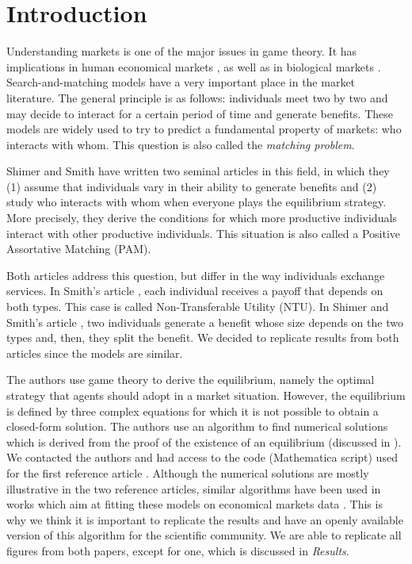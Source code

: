 \section*{Introduction}

Understanding markets is one of the major issues in game theory. It has implications in human economical markets \citep{osborne_bargaining_1990,chade_sorting_2017}, as well as in biological markets \citep{noe_biological_1995,hammerstein_biological_2016,fruteau_supply_2009,baumard_mutualistic_2013}. Search-and-matching models have a very important place in the market literature. The general principle is as follows: individuals meet two by two and may decide to interact for a certain period of time and generate benefits. These models are widely used to try to predict a fundamental property of markets: who interacts with whom. This question is also called the \textit{matching problem}.

Shimer and Smith have written two seminal articles \citep{shimer_assortative_2000,smith_marriage_2006} in this field, in which they (1) assume that individuals vary in their ability to generate benefits and (2) study who interacts with whom when everyone plays the equilibrium strategy. More precisely, they derive the conditions for which more productive individuals interact with other productive individuals. This situation is also called a Positive Assortative Matching (PAM).

Both articles address this question, but differ in the way individuals exchange services. In Smith's article \citep{smith_marriage_2006}, each individual receives a payoff that depends on both types. This case is called Non-Transferable Utility (NTU). In Shimer and Smith's article \citep{shimer_assortative_2000}, two individuals generate a benefit whose size depends on the two types and, then, they split the benefit. We decided to replicate results from both articles since the models are similar.

The authors use game theory to derive the equilibrium, namely the optimal strategy that agents should adopt in a market situation. However, the equilibrium is defined by three complex equations for which it is not possible to obtain a closed-form solution. The authors use an algorithm to find numerical solutions which is derived from the proof of the existence of an equilibrium (discussed in \citep{smith_frictional_2011}). We contacted the authors and had access to the code (Mathematica script) used for the first reference article \citep{shimer_assortative_2000}. Although the numerical solutions are mostly illustrative in the two reference articles, similar algorithms have been used in works which aim at fitting these models on economical markets data \citep{hagedorn_identifying_2017,lise_matching_2016}. This is why we think it is important to replicate the results and have an openly available version of this algorithm for the scientific community. We are able to replicate all figures from both papers, except for one, which is discussed in \textit{Results}.




